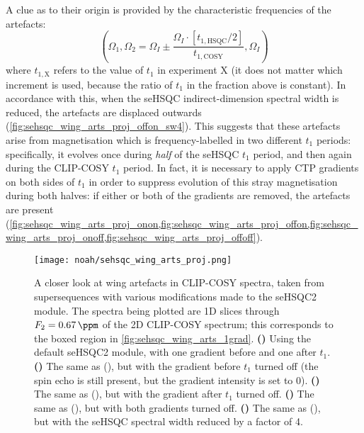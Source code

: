A clue as to their origin is provided by the characteristic frequencies of the artefacts:
\begin{equation}
    \label{eq:wing_artefact_frequencies}
    \left(\Omega_1, \Omega_2 = \Omega_I \pm \frac{\Omega_I \cdot [t_{1,\text{HSQC}}/2]}{t_{1,\text{COSY}}}, \Omega_I\right)
\end{equation}
where $t_{1,\text{X}}$ refers to the value of $t_1$ in experiment X (it does not matter which increment is used, because the ratio of $t_1$ in the fraction above is constant).
In accordance with this, when the seHSQC indirect-dimension spectral width is reduced, the artefacts are displaced outwards (\cref{fig:sehsqc_wing_arts_proj_offon_sw4}).
This suggests that these artefacts arise from  magnetisation which is frequency-labelled in two different $t_1$ periods: specifically, it evolves once during \textit{half} of the seHSQC $t_1$ period, and then again during the CLIP-COSY $t_1$ period.
In fact, it is necessary to apply CTP gradients on both sides of $t_1$ in order to suppress evolution of this stray magnetisation during both halves: if either or both of the gradients are removed, the artefacts are present (\cref{fig:sehsqc_wing_arts_proj_onon,fig:sehsqc_wing_arts_proj_offon,fig:sehsqc_wing_arts_proj_onoff,fig:sehsqc_wing_arts_proj_offoff}).

\begin{figure}[!ht]
    \centering
    \texttt{[image: noah/sehsqc\_wing\_arts\_proj.png]}%
    {\label{fig:sehsqc_wing_arts_proj_onon}}%
    {\label{fig:sehsqc_wing_arts_proj_offon}}%
    {\label{fig:sehsqc_wing_arts_proj_onoff}}%
    {\label{fig:sehsqc_wing_arts_proj_offoff}}%
    {\label{fig:sehsqc_wing_arts_proj_offon_sw4}}%
    \caption[More detail about wing artefacts in CLIP-COSY spectra]{
        A closer look at wing artefacts in CLIP-COSY spectra, taken from  supersequences with various modifications made to the seHSQC2 module.
        The spectra being plotted are 1D slices through $F_2 = \qty{0.67}{\ppm}$ of the 2D CLIP-COSY spectrum; this corresponds to the boxed region in \cref{fig:sehsqc_wing_arts_1grad}.
        \textbf{()} Using the default seHSQC2 module, with one gradient before and one after $t_1$.
        \textbf{()} The same as (), but with the gradient before $t_1$ turned off (the spin echo is still present, but the gradient intensity is set to 0).
        \textbf{()} The same as (), but with the gradient after $t_1$ turned off.
        \textbf{()} The same as (), but with both gradients turned off.
        \textbf{()} The same as (), but with the seHSQC spectral width reduced by a factor of 4.
    }
    \label{fig:sehsqc_wing_arts_proj}
\end{figure}

